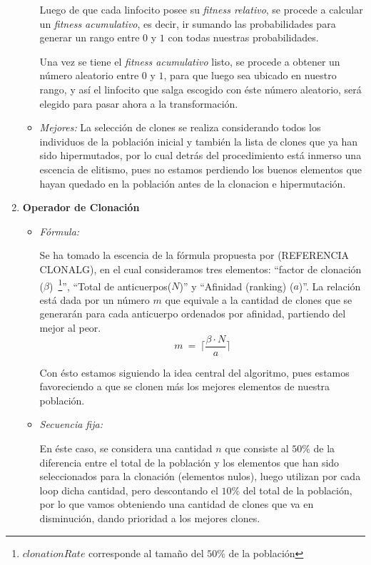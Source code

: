 \begin{enumerate}
\begin{itemize}
				Luego de que cada linfocito posee su \emph{fitness relativo}, se procede a calcular un \emph{fitness acumulativo},
				es decir, ir sumando las probabilidades para generar un rango entre $0$ y $1$ con todas nuestras probabilidades.
					
				Una vez se tiene el \emph{fitness acumulativo} listo, se procede a obtener un número aleatorio entre $0$ y $1$,
				para que luego sea ubicado en nuestro rango, y así el linfocito que salga escogido con éste número aleatorio, será
				elegido para pasar ahora a la transformación.
		
			\item \emph{Mejores:}
				La selección de clones se realiza considerando todos los individuos de la población inicial y también
				la lista de clones que ya han sido hipermutados, por lo cual detrás del procedimiento está inmerso una
				escencia de elitismo, pues no estamos perdiendo los buenos elementos que hayan quedado en la población
				antes de la clonacion e hipermutación.

		\end{itemize}
	\item \textbf{Operador de Clonación}
		\begin{itemize}
			\item \emph{Fórmula:}

				Se ha tomado la escencia de la fórmula propuesta por (REFERENCIA CLONALG),
				en el cual consideramos tres elementos: ``factor de clonación ($\beta$)~\footnote{$clonationRate$
				corresponde al tamaño del $50\%$ de la población}'', ``Total de anticuerpos($N$)'' y
				``Afinidad (ranking) ($a$)''.
				La relación está dada por un número $m$ que equivale a la cantidad de clones que se generarán
				para cada anticuerpo ordenados por afinidad, partiendo del mejor al peor.
				$$m\ =\ \lceil\frac{\beta \cdot N}{a}\rceil$$

				Con ésto estamos siguiendo la idea central del algoritmo, pues estamos favoreciendo a que se clonen más
				los mejores elementos de nuestra población.
				
			\item \emph{Secuencia fija:}
			
				En éste caso, se considera una cantidad $n$ que consiste al $50\%$ de la diferencia entre el total de la población
				y los elementos que han sido seleccionados para la clonación (elementos nulos), luego utilizan por cada loop
				dicha cantidad, pero descontando el $10\%$ del total de la población, por lo que vamos obteniendo una cantidad
				de clones que va en disminución, dando prioridad a los mejores clones.
			

\end{itemize}
\end{enumerate}
